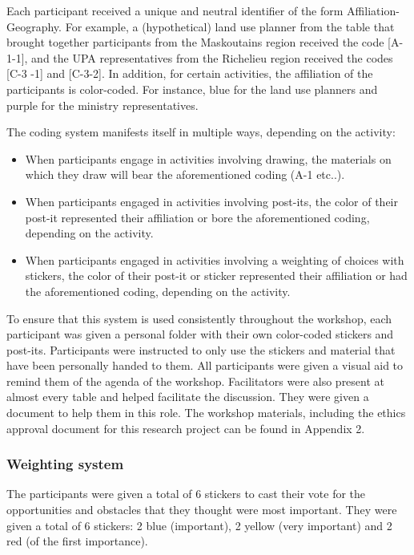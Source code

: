 Each participant received a unique and neutral identifier of the form Affiliation-Geography. For example, a (hypothetical) land use planner from the table that brought together participants from the Maskoutains region received the code [A-1-1], and the UPA representatives from the Richelieu region received the codes [C-3 -1] and [C-3-2]. In addition, for certain activities, the affiliation of the participants is color-coded. For instance, blue for the land use planners and purple for the ministry representatives.

The coding system manifests itself in multiple ways, depending on the activity:
\begin{itemize}
\item When participants engage in activities involving drawing, the materials on which they draw will bear the aforementioned coding (A-1 etc..).
\item When participants engaged in activities involving post-its, the color of their post-it represented their affiliation or bore the aforementioned coding, depending on the activity.
\item When participants engaged in activities involving a weighting of choices with stickers, the color of their post-it or sticker represented their affiliation or had the aforementioned coding, depending on the activity.
\end{itemize}

To ensure that this system is used consistently throughout the workshop, each participant was given a personal folder with their own color-coded stickers and post-its. Participants were instructed to only use the stickers and material that have been personally handed to them. All participants were given a visual aid to remind them of the agenda of the workshop. Facilitators were also present at almost every table and helped facilitate the discussion. They were given a document to help them in this role. The workshop materials, including the ethics approval document for this research project can be found in Appendix 2.\\

\subsubsection*{Weighting system}

 The participants were given a total of 6 stickers to cast their vote for the opportunities and obstacles that they thought were most important. They were given a total of 6 stickers: 2 blue (important), 2 yellow (very important) and 2 red (of the first importance).\\

